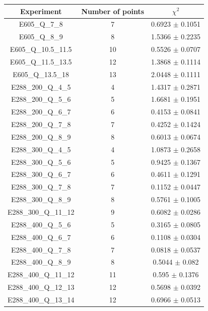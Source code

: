 \documentclass[
]{article}
\begin{document}
\begin{table}[h]

\centering

\begin{tabular}{|c|c|c|} \hline

\textbf{Experiment} & \textbf{Number of
points} & \textbf{\(\chi^2\)} \\ \hline

E605\_Q\_7\_8 & 7 & 0.6923 \(\pm\) 0.1051 \\ \hline
E605\_Q\_8\_9 & 8 & 1.5366 \(\pm\) 0.2235 \\ \hline
E605\_Q\_10.5\_11.5 & 10 & 0.5526 \(\pm\) 0.0707 \\ \hline
E605\_Q\_11.5\_13.5 & 12 & 1.3868 \(\pm\) 0.1114 \\ \hline
E605\_Q\_13.5\_18 & 13 & 2.0448 \(\pm\) 0.1111 \\ \hline
E288\_200\_Q\_4\_5 & 4 & 1.4317 \(\pm\) 0.2871 \\ \hline
E288\_200\_Q\_5\_6 & 5 & 1.6681 \(\pm\) 0.1951 \\ \hline
E288\_200\_Q\_6\_7 & 6 & 0.4153 \(\pm\) 0.0841 \\ \hline
E288\_200\_Q\_7\_8 & 7 & 0.4252 \(\pm\) 0.1424 \\ \hline
E288\_200\_Q\_8\_9 & 8 & 0.6013 \(\pm\) 0.0674 \\ \hline
E288\_300\_Q\_4\_5 & 4 & 1.0873 \(\pm\) 0.2658 \\ \hline
E288\_300\_Q\_5\_6 & 5 & 0.9425 \(\pm\) 0.1367 \\ \hline
E288\_300\_Q\_6\_7 & 6 & 0.4611 \(\pm\) 0.1291 \\ \hline
E288\_300\_Q\_7\_8 & 7 & 0.1152 \(\pm\) 0.0447 \\ \hline
E288\_300\_Q\_8\_9 & 8 & 0.5761 \(\pm\) 0.1005 \\ \hline
E288\_300\_Q\_11\_12 & 9 & 0.6082 \(\pm\) 0.0286 \\ \hline
E288\_400\_Q\_5\_6 & 5 & 0.3165 \(\pm\) 0.0805 \\ \hline
E288\_400\_Q\_6\_7 & 6 & 0.1108 \(\pm\) 0.0304 \\ \hline
E288\_400\_Q\_7\_8 & 7 & 0.0818 \(\pm\) 0.0537 \\ \hline
E288\_400\_Q\_8\_9 & 8 & 0.5044 \(\pm\) 0.082 \\ \hline
E288\_400\_Q\_11\_12 & 11 & 0.595 \(\pm\) 0.1376 \\ \hline
E288\_400\_Q\_12\_13 & 12 & 0.5698 \(\pm\) 0.0392 \\ \hline
E288\_400\_Q\_13\_14 & 12 & 0.6966 \(\pm\) 0.0513 \\ \hline

\end{tabular}
\end{table}
\end{document}
